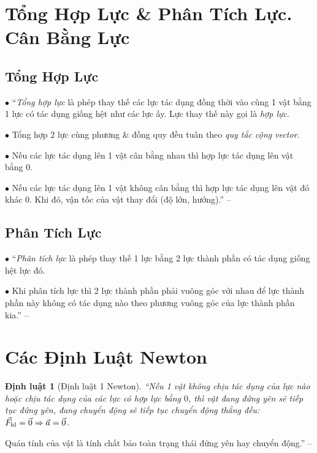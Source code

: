\documentclass{article}
\numberwithin{equation}{section}
\newtheorem{dinhluat}{Định luật}[section]
\begin{document}

\section{Tổng Hợp Lực \& Phân Tích Lực. Cân Bằng Lực}

\subsection{Tổng Hợp Lực}
\begin{enumerate*}
	\item[$\bullet$] ``\textit{Tổng hợp lực} là phép thay thế các lực tác dụng đồng thời vào cùng 1 vật bằng 1 lực có tác dụng giống hệt như các lực ấy. Lực thay thế này gọi là \textit{hợp lực}.
	\item[$\bullet$] Tổng hợp 2 lực cùng phương \& đồng quy đều tuân theo \textit{quy tắc cộng vector}.
	\item[$\bullet$] Nếu các lực tác dụng lên 1 vật cân bằng nhau thì hợp lực tác dụng lên vật bằng $0$.
	\item[$\bullet$] Nếu các lực tác dụng lên 1 vật không cân bằng thì hợp lực tác dụng lên vật đó khác $0$. Khi đó, vận tốc của vật thay đổi (độ lớn, hướng).'' -- \cite[Chủ đề II: \textit{Động Lực Học}, p. 19]{Giang_Hang_Trung2022}
\end{enumerate*}

\subsection{Phân Tích Lực}
\begin{enumerate*}
	\item[$\bullet$] ``\textit{Phân tích lực} là phép thay thế 1 lực bằng 2 lực thành phần có tác dụng giống hệt lực đó.
	\item[$\bullet$] Khi phân tích lực thì 2 lực thành phần phải vuông góc với nhau để lực thành phần này không có tác dụng nào theo phương vuông góc của lực thành phần kia.'' -- \cite[p. 19]{Giang_Hang_Trung2022}
\end{enumerate*}

\section{Các Định Luật Newton}

\begin{dinhluat}[Định luật 1 Newton]
	``Nếu 1 vật không chịu tác dụng của lực nào hoặc chịu tác dụng của các lực có hợp lực bằng $0$, thì vật đang đứng yên sẽ tiếp tục đứng yên, đang chuyển động sẽ tiếp tục chuyển động thẳng đều: $\vec{F}_{\rm hl} = \vec{0}\Rightarrow\vec{a} = \vec{0}$.
\end{dinhluat}
Quán tính của vật là tính chất bảo toàn trạng thái đứng yên hay chuyển động.'' -- \cite[p. 19]{Giang_Hang_Trung2022}
\end{document}
